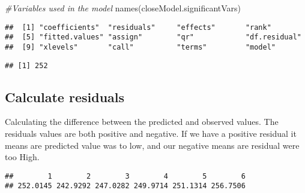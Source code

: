 \documentclass[
]{article}
\newenvironment{Shaded}{\begin{snugshade}}{\end{snugshade}}
\newcommand{\CommentTok}[1]{\textcolor[rgb]{0.56,0.35,0.01}{\textit{#1}}}
\newcommand{\FunctionTok}[1]{\textcolor[rgb]{0.00,0.00,0.00}{#1}}
\newcommand{\NormalTok}[1]{#1}
\newcommand{\OtherTok}[1]{\textcolor[rgb]{0.56,0.35,0.01}{#1}}
\newcommand{\SpecialCharTok}[1]{\textcolor[rgb]{0.00,0.00,0.00}{#1}}
\begin{document}
\begin{Shaded}
\begin{Highlighting}[]
\CommentTok{\#Variables used in the model}
\FunctionTok{names}\NormalTok{(closeModel.significantVars)}
\end{Highlighting}
\end{Shaded}

\begin{verbatim}
##  [1] "coefficients"  "residuals"     "effects"       "rank"         
##  [5] "fitted.values" "assign"        "qr"            "df.residual"  
##  [9] "xlevels"       "call"          "terms"         "model"
\end{verbatim}

\begin{Shaded}
\end{Shaded}

\begin{verbatim}
## [1] 252
\end{verbatim}

\hypertarget{calculate-residuals}{%
\subsection{Calculate residuals}\label{calculate-residuals}}

Calculating the difference between the predicted and observed values.
The residuals values are both positive and negative. If we have a
positive residual it means are predicted value was to low, and our
negative means are residual were too High.

\begin{Shaded}
\end{Shaded}

\begin{verbatim}
##        1        2        3        4        5        6 
## 252.0145 242.9292 247.0282 249.9714 251.1314 256.7506
\end{verbatim}
\end{document}
